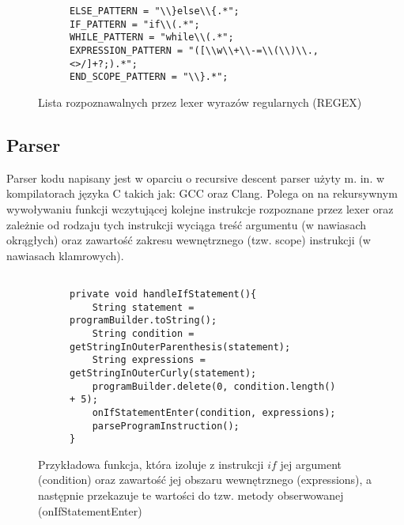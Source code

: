 		\break
		
				
\begin{figure}[H]
  \begin{subfigure}{\textwidth}
			\begin{verbatim}
ELSE_PATTERN = "\\}else\\{.*";
IF_PATTERN = "if\\(.*";
WHILE_PATTERN = "while\\(.*";
EXPRESSION_PATTERN = "([\\w\\+\\-=\\(\\)\\.,<>/]+?;).*";
END_SCOPE_PATTERN = "\\}.*";
			\end{verbatim}
  \end{subfigure}\hfill
  \caption{Lista rozpoznawalnych przez lexer wyrazów regularnych (REGEX)}
\end{figure}
			
	\subsection{Parser} 		
	Parser kodu napisany jest w oparciu o recursive descent parser użyty m. in. w kompilatorach języka C takich jak: GCC oraz Clang. Polega on na rekursywnym wywoływaniu funkcji wczytującej kolejne instrukcje rozpoznane przez lexer oraz zależnie od rodzaju tych instrukcji wyciąga treść argumentu (w nawiasach okrągłych) oraz zawartość zakresu wewnętrznego (tzw. scope) instrukcji (w nawiasach klamrowych).		
						
\begin{figure}[H]
  \begin{subfigure}{\textwidth}
			\begin{verbatim}

private void handleIfStatement(){
    String statement = programBuilder.toString();
    String condition = getStringInOuterParenthesis(statement);
    String expressions = getStringInOuterCurly(statement);
    programBuilder.delete(0, condition.length() + 5);
    onIfStatementEnter(condition, expressions);
    parseProgramInstruction();
}
			\end{verbatim}
  \end{subfigure}\hfill
  \caption{Przykładowa funkcja, która izoluje z instrukcji $if$ jej argument (condition) oraz zawartość jej obszaru wewnętrznego (expressions), a następnie przekazuje te wartości do tzw. metody obserwowanej (onIfStatementEnter)}
\end{figure}
		
